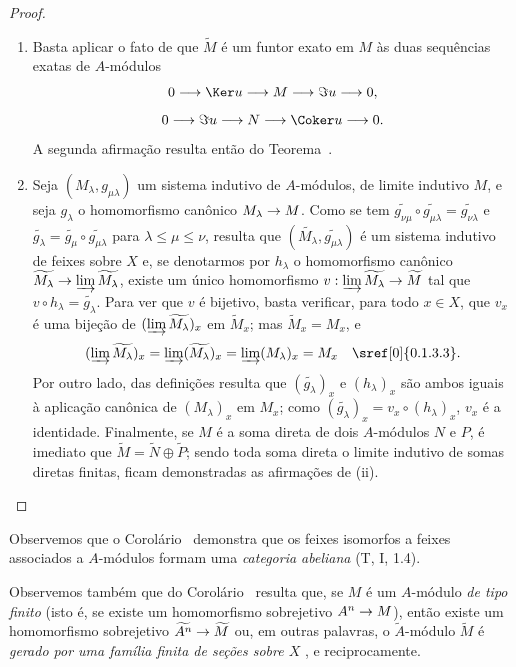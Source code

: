 \documentclass[oneside]{amsart}
\makeatletter
\renewcommand{\leq}{\leqslant}
\newcommand{\ega@arrow}[2]{\mathchoice{#1}{#2}{#2}{#2}}
\renewcommand{\to}{\ega@arrow{\longrightarrow}{\rightarrow}}
\newcommand{\oldpage}[2][]{{\marginnote{\normalfont\textbf{#1}~|~#2}}\ignorespaces}
\makeatother
\begin{document}
\begin{proof}
\medskip\noindent
\begin{enumerate}
  \item[(i)] Basta aplicar o fato de que $\widetilde{M}$ é um funtor exato em $M$  às duas sequências exatas de $A$-módulos
    \[
      0\to\Ker u\to M\to\Im u\to 0,
    \]
    \[
      0\to\Im u\to N\to\Coker u\to 0.
    \]
    A segunda afirmação resulta então do Teorema~.
  \item[(ii)] Seja $(M_\lambda,g_{\mu\lambda})$ um sistema indutivo de $A$-módulos, de limite indutivo $M$, e seja $g_\lambda$ o homomorfismo canônico $M_\lambda\to M$.
    Como se tem $\widetilde{g_{\nu\mu}}\circ\widetilde{g_{\mu\lambda}}=\widetilde{g_{\nu\lambda}}$ e $\widetilde{g_\lambda}=\widetilde{g_\mu}\circ\widetilde{g_{\mu\lambda}}$ para $\lambda\leq\mu\leq\nu$, resulta que $(\widetilde{M_\lambda},\widetilde{g_{\mu\lambda}})$ é um sistema indutivo de feixes sobre $X$ e, se denotarmos por $h_\lambda$ o homomorfismo canônico $\widetilde{M_\lambda}\to\varinjlim\widetilde{M_\lambda}$, existe um único homomorfismo $v:\varinjlim\widetilde{M_\lambda}\to\widetilde{M}$ tal que $v\circ h_\lambda=\widetilde{g_\lambda}$.
    Para ver que $v$ é bijetivo, basta verificar, para todo $x\in X$, que $v_x$ é uma bijeção de $(\varinjlim\widetilde{M_\lambda})_x$ em $\widetilde{M}_x$;
    mas $\widetilde{M}_x=M_x$, e
    \[
      (\varinjlim\widetilde{M_\lambda})_x=\varinjlim(\widetilde{M_\lambda})_x
      =\varinjlim(M_\lambda)_x=M_x\quad\sref[0]{0.1.3.3}.
    \]
    Por outro lado, das definições resulta que $(\widetilde{g_\lambda})_x$ e
    $(h_\lambda)_x$ são ambos iguais à aplicação canônica de $(M_\lambda)_x$ em $M_x$;
    como $(\widetilde{g_\lambda})_x=v_x\circ(h_\lambda)_x$, $v_x$ é a identidade.
\oldpage[I]{88}
    Finalmente, se $M$ é a soma direta de dois $A$-módulos $N$ e $P$, é imediato que $\widetilde{M}=\widetilde{N}\oplus\widetilde{P}$;
    sendo toda soma direta o limite indutivo de somas diretas finitas, ficam demonstradas as afirmações de (ii).
\end{enumerate}
\end{proof}

Observemos que o Corolário~ demonstra que os feixes isomorfos a feixes associados a $A$-módulos formam uma \emph{categoria abeliana} (T, I, 1.4).

Observemos também que do Corolário~ resulta que, se $M$ é um $A$-módulo \emph{de tipo finito} (isto é, se existe um homomorfismo sobrejetivo $A^n\to M$), então existe um homomorfismo sobrejetivo $\widetilde{A^n}\to\widetilde{M}$ ou, em outras palavras, o $\widetilde{A}$-módulo $\widetilde{M}$ é \emph{gerado por uma família finita de seções sobre $X$} , e reciprocamente.
\end{document}
